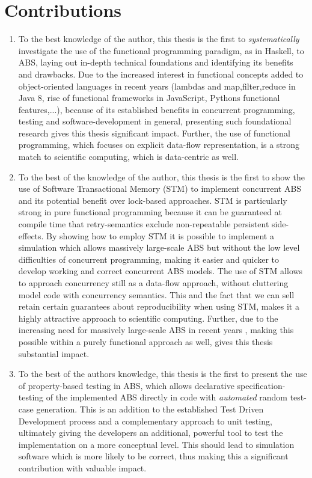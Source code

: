 \section{Contributions}
\begin{enumerate}
	\item To the best knowledge of the author, this thesis is the first to \textit{systematically} investigate the use of the functional programming paradigm, as in Haskell, to ABS, laying out in-depth technical foundations and identifying its benefits and drawbacks. Due to the increased interest in functional concepts added to object-oriented languages in recent years (lambdas and map,filter,reduce in Java 8, rise of functional frameworks in JavaScript, Pythons functional features,...), because of its established benefits in concurrent programming, testing and software-development in general, presenting such foundational research gives this thesis significant impact. Further, the use of functional programming, which focuses on explicit data-flow representation, is a strong match to scientific computing, which is data-centric as well.
	
	\item To the best of the knowledge of the author, this thesis is the first to show the use of Software Transactional Memory (STM) to implement concurrent ABS and its potential benefit over lock-based approaches. STM is particularly strong in pure functional programming because it can be guaranteed  at compile time that retry-semantics exclude non-repeatable persistent side-effects. By showing how to employ STM it is possible to implement a simulation which allows massively large-scale ABS but without the low level difficulties of concurrent programming, making it easier and quicker to develop working and correct concurrent ABS models. The use of STM allows to approach concurrency still as a data-flow approach, without cluttering model code with concurrency semantics. This and the fact that we can sell retain certain guarantees about reproducibility when using STM, makes it a highly attractive approach to scientific computing. Further, due to the increasing need for massively large-scale ABS in recent years \cite{lysenko_framework_2008}, making this possible within a purely functional approach as well, gives this thesis substantial impact.
	
	\item To the best of the authors knowledge, this thesis is the first to present the use of property-based testing in ABS, which allows declarative specification-testing of the implemented ABS directly in code with \textit{automated} random test-case generation. This is an addition to the established Test Driven Development process and a complementary approach to unit testing, ultimately giving the developers an additional, powerful tool to test the implementation on a more conceptual level. This should lead to simulation software which is more likely to be correct, thus making this a significant contribution with valuable impact.


\end{enumerate}
